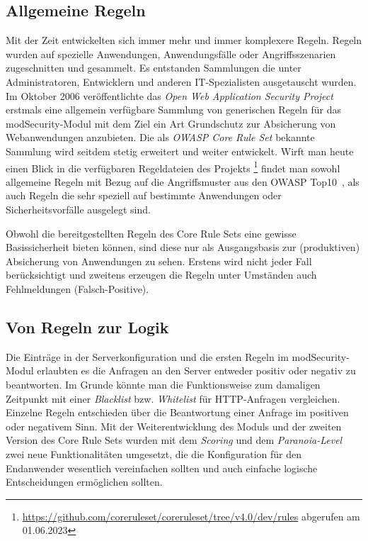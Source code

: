 \subsection{Allgemeine Regeln}
Mit der Zeit entwickelten sich immer mehr und immer komplexere Regeln. Regeln wurden auf spezielle Anwendungen, Anwendungsfälle oder Angriffsszenarien zugeschnitten und gesammelt. Es entstanden Sammlungen die unter Administratoren, Entwicklern und anderen IT-Spezialisten ausgetauscht wurden.
Im Oktober 2006 veröffentlichte das \emph{Open Web Application Security Project} erstmals eine allgemein verfügbare Sammlung von generischen Regeln für das modSecurity-Modul mit dem Ziel ein Art Grundschutz zur Absicherung von Webanwendungen anzubieten. Die als \emph{OWASP Core Rule Set} bekannte Sammlung wird seitdem stetig erweitert und weiter entwickelt. Wirft man heute einen Blick in die verfügbaren Regeldateien des Projekts \footnote{\url{https://github.com/coreruleset/coreruleset/tree/v4.0/dev/rules} abgerufen am 01.06.2023} findet man sowohl allgemeine Regeln mit Bezug auf die Angriffsmuster aus den OWASP Top10~\cite{owasp10}, als auch Regeln die sehr speziell auf bestimmte Anwendungen oder Sicherheitsvorfälle ausgelegt sind.

Obwohl die bereitgestellten Regeln des Core Rule Sets eine gewisse Basissicherheit bieten können, sind diese nur als Ausgangsbasis zur (produktiven) Absicherung von Anwendungen zu sehen. Erstens wird nicht jeder Fall berücksichtigt und zweitens erzeugen die Regeln unter Umständen auch Fehlmeldungen (Falsch-Positive).

\subsection{Von Regeln zur Logik}
\label{sec:rullog}
Die Einträge in der Serverkonfiguration und die ersten Regeln im modSecurity-Modul erlaubten es die Anfragen an den Server entweder positiv oder negativ zu beantworten. Im Grunde könnte man die Funktionsweise zum damaligen Zeitpunkt mit einer \emph{Blacklist} bzw. \emph{Whitelist} für HTTP-Anfragen vergleichen. Einzelne Regeln entschieden über die Beantwortung einer Anfrage im positiven oder negativem Sinn. Mit der Weiterentwicklung des Moduls und der zweiten Version des Core Rule Sets wurden mit dem \emph{Scoring} und dem \emph{Paranoia-Level} zwei neue Funktionalitäten umgesetzt, die die Konfiguration für den Endanwender wesentlich vereinfachen sollten und auch einfache logische Entscheidungen ermöglichen sollten.\\

